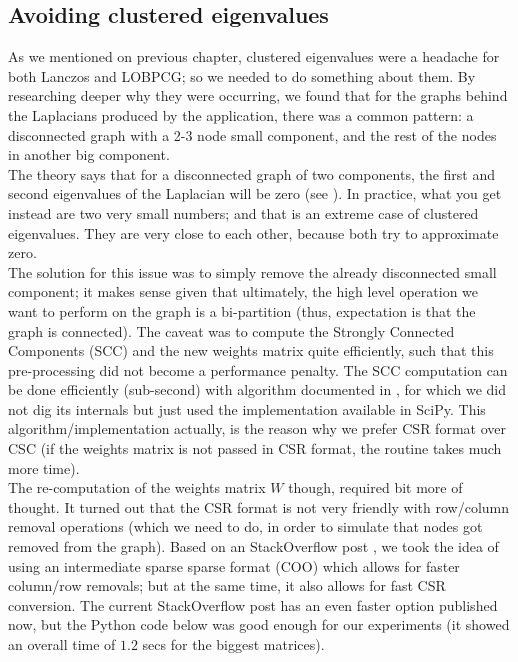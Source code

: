 \subsection{Avoiding clustered eigenvalues}

As we mentioned on previous chapter, clustered eigenvalues were a
headache for both Lanczos and LOBPCG; so we needed to do something
about them. By researching deeper why they were occurring, we found
that for the graphs behind the Laplacians produced by the
application, there was a common pattern: a disconnected graph with a
2-3 node small component, and the rest of the nodes in another big
component. \\

The theory says that for a disconnected graph of two components, the
first and second eigenvalues of the Laplacian will be zero (see
\cite{luxburg07}). In practice, what you get instead are two very
small numbers; and that is an extreme case of clustered
eigenvalues. They are very close to each other, because both try to
approximate zero. \\

The solution for this issue was to simply remove the already
disconnected small component; it makes sense given that ultimately,
the high level operation we want to perform on the graph is a
bi-partition (thus, expectation is that the graph is connected). The
caveat was to compute the Strongly Connected Components (SCC) and the
new weights matrix quite efficiently, such that this pre-processing
did not become a performance penalty. The SCC computation can be done
efficiently (sub-second) with algorithm documented in \cite{pearce05},
for which we did not dig its internals but just used the
implementation available in SciPy. This  
algorithm/implementation actually, is the reason why we prefer CSR
format over CSC (if the weights matrix is not passed in CSR format,
the routine takes much more time). \\

The re-computation of the weights matrix $W$ though, required bit more
of thought. It turned out that the CSR format is not very friendly
with row/column removal operations (which we need to do, in order to
simulate that nodes got removed from the graph). Based on an
StackOverflow post \cite{alim15}, we took the idea of using an
intermediate sparse sparse format (COO) which allows for faster
column/row removals; but at the same time, it also allows for fast CSR
conversion. The current StackOverflow post has an even faster option
published now, but the Python code below was good enough for our
experiments (it showed an overall time of $1.2$ secs for the biggest
matrices). \\

